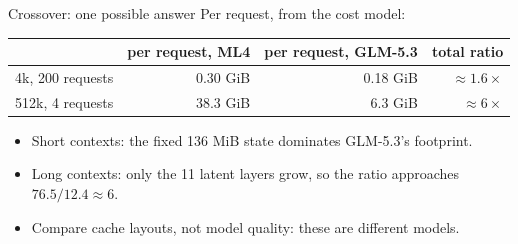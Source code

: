 \documentclass[handout]{beamer}
\begin{document}
\begin{frame}{Crossover: one possible answer}
  \small
  Per request, from the cost model:
  \par\vspace{4pt}
  \centering
  \begin{tabular}{@{}lrrr@{}}
    \toprule
    & per request, ML4 & per request, GLM-5.3 & total ratio \\
    \midrule
    4k, 200 requests & 0.30 GiB & 0.18 GiB & $\approx1.6\times$ \\
    512k, 4 requests & 38.3 GiB & 6.3 GiB & $\approx6\times$ \\
    \bottomrule
  \end{tabular}
  \par\vspace{8pt}
  \raggedright
  \begin{itemize}
      \setlength{\itemsep}{5pt}
    \item Short contexts: the fixed 136 MiB state dominates GLM-5.3's footprint.
    \item Long contexts: only the 11 latent layers grow, so the ratio approaches $76.5/12.4\approx6$.
    \item Compare cache layouts, not model quality: these are different models.
  \end{itemize}
\end{frame}
\end{document}
